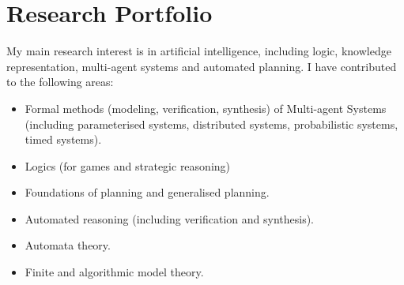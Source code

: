 \documentclass[10pt,a4paper,sans]{moderncv}
\begin{document}
\section{Research Portfolio}
My main research interest is in artificial intelligence, including logic, knowledge representation, multi-agent systems and automated planning. %
I have contributed to the following areas:
\begin{itemize}
 \item Formal methods (modeling, verification, synthesis) of Multi-agent Systems (including parameterised systems, distributed systems, probabilistic systems, timed systems).
 \item Logics (for games and strategic reasoning)
 \item Foundations of planning and generalised planning.
 \item Automated reasoning (including verification and synthesis).
 \item Automata theory.
 \item Finite and algorithmic model theory.
\end{itemize}




% 
% 
\end{document}
